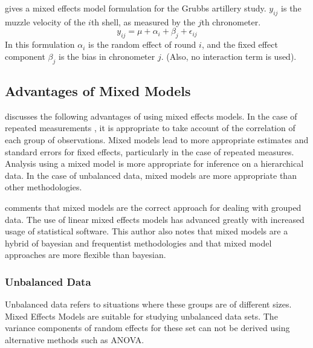 \documentclass[12pt, a4paper]{report}
\theoremstyle{plain}
\theoremstyle{definition}
\theoremstyle{remark}
\begin{document}
\citet{Searle} gives a mixed effects model formulation for the
Grubbs artillery study. $y_{ij}$ is the muzzle velocity of the
$i$th shell, as measured by the $j$th chronometer.
\begin{equation}
y_{ij} = \mu + \alpha_{i} + \beta_{j}  + \epsilon_{ij}
\end{equation}
In this formulation $\alpha_{i}$ is the random effect of round
$i$, and the fixed effect component $\beta_{j}$ is the bias in
chronometer $j$. (Also, no interaction term is used).






\subsection{Advantages of Mixed Models}
\citet{BrownPrescott} discusses the  following advantages of using
mixed effects models. In the case of repeated measurements , it is
appropriate to take account of the correlation of each group of
observations. Mixed models lead to more appropriate estimates and
standard errors for fixed effects, particularly in the case of
repeated measures. Analysis using a mixed model is more
appropriate for inference on a hierarchical data. In the case of
unbalanced data, mixed models are more appropriate than other
methodologies.

\citet{Demi} comments that mixed models are the correct approach
for dealing with grouped data. The use of linear mixed effects
models has advanced greatly with increased usage of statistical
software. This author also notes that mixed models are a hybrid of
bayesian and frequentist methodologies and that mixed model
approaches are more flexible than bayesian.


\subsubsection{Unbalanced Data} Unbalanced data refers to situations where these groups are
of different sizes. Mixed Effects Models are suitable for studying
unbalanced data sets. The variance components of random effects
for these set can not be derived using alternative methods such as
ANOVA.
\end{document}
